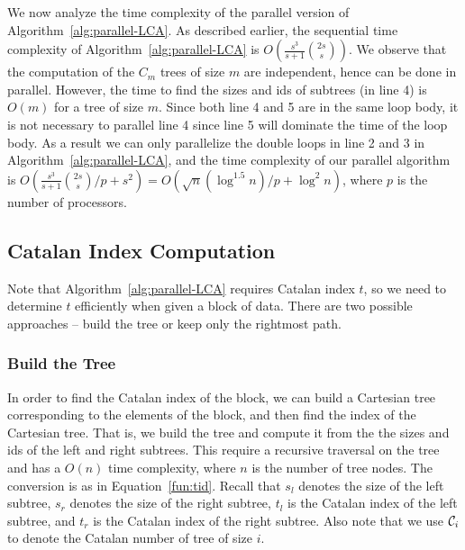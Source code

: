 We now analyze the time complexity of the parallel version of
Algorithm~\ref{alg:parallel-LCA}.  As described earlier, the
sequential time complexity of Algorithm~\ref{alg:parallel-LCA} is
$O(\frac{s^3}{s+1} \binom{2s}{s})$.  We observe that the computation
of the $C_m$ trees of size $m$ are independent, hence can be done in
parallel.  However, the time to find the sizes and ids of subtrees (in
line 4) is $O(m)$ for a tree of size $m$.  Since both line 4 and 5 are
in the same loop body, it is not necessary to parallel line 4 since
line 5 will dominate the time of the loop body.  As a result we can
only parallelize the double loops in line 2 and 3 in
Algorithm~\ref{alg:parallel-LCA}, and the time complexity of our
parallel algorithm is $O(\frac{s^3}{s+1} \binom{2s}{s} / p + s^2) =
O(\sqrt{n} (\log ^{1.5} n) / p + \log^2 n )$, where $p$ is the number
of processors.



\subsection{Catalan Index Computation}

Note that Algorithm~\ref{alg:parallel-LCA} requires Catalan index $t$,
so we need to determine $t$ efficiently when given a block of data.
There are two possible approaches -- build the tree or keep only the
rightmost path.


\subsubsection{Build the Tree}

In order to find the Catalan index of the block, we can build a
Cartesian tree corresponding to the elements of the block, and then
find the index of the Cartesian tree.  That is, we build the tree and
compute it from the the sizes and ids of the left and right subtrees.
This require a recursive traversal on the tree and has a $O(n)$ time
complexity, where $n$ is the number of tree nodes.  The conversion is
as in Equation~\ref{fun:tid}.  Recall that $s_l$ denotes the size of
the left subtree, $s_r$ denotes the size of the right subtree, $t_l$
is the Catalan index of the left subtree, and $t_r$ is the Catalan
index of the right subtree.  Also note that we use ${\cal C}_i$ to
  denote the Catalan number of tree of size $i$.

